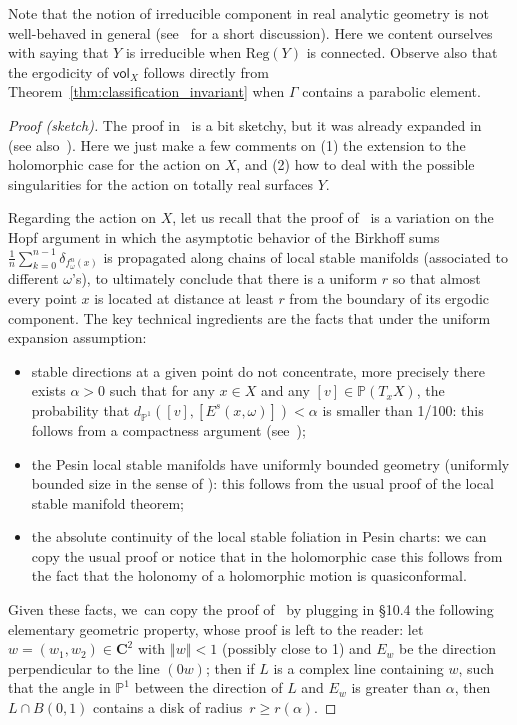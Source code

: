 \documentclass[JEP,XML,SOM,Unicode,published]{cedram}
\newcommand{\norm}[1]{{\left\Vert#1\right\Vert}}
\newcommand{\unsur}[1]{\frac{1}{#1}}
\newcommand{\lrpar}[1]{\left(#1\right)}
\newcommand{\pp}{\mathbb{P}}\let\P\pp
\def\C{\mathbf{C}}
\newcommand{\vol}{{\mathsf{vol}}}
\theoremstyle{plain}
\theoremstyle{definition}
\begin{document}
Note that the notion of irreducible component in real analytic geometry is not well-behaved in general
(see~\cite[\S 5.1]{invariant} for a short discussion).
Here we content ourselves with saying that $Y$ is irreducible when $\mathrm{Reg}(Y)$ is connected.
Observe also that the ergodicity of
$\vol_X$ follows directly from Theorem~\ref{thm:classification_invariant} when $\Gamma$
contains a parabolic element.

\begin{proof}[Proof (sketch)]
The proof in~\cite{dolgopyat-krikorian} is a bit sketchy, but it was already
expanded in~\cite{liu_thesis, chung} (see also~\cite{zzhang}).
Here we just make a few comments on (1) the extension to the holomorphic case for the action on $X$,
and (2) how to deal with the possible singularities for the action on totally real surfaces $Y$.

Regarding the action on $X$, let us recall that the proof of~\cite{dolgopyat-krikorian} is a
variation on the Hopf argument in which the asymptotic behavior of the Birkhoff
sums $ \unsur{n}\sum_{k=0}^{n-1} \delta_{f_\omega^n(x)}$ is propagated along chains of
local stable manifolds (associated to different $\omega$'s), to ultimately conclude that there
is a uniform $r$ so that almost every point $x$
is located at distance at least $r$ from the boundary of its ergodic component.
The key technical ingredients are the facts that under the uniform expansion assumption:
\begin{itemize}
\item stable directions at a given point do not concentrate, more precisely there exists
$\alpha>0$ such that for any $x\in X$ and any $[v]\in \pp(T_x X)$, the probability that
$d_{\P^1}\lrpar{[v], [E^s(x,\omega) ]} <\alpha$ is smaller than 1/100: this follows from a compactness argument
(see~\cite[Prop.\,4.4.4]{liu_thesis});
\item the Pesin local stable manifolds have uniformly bounded geometry
(\eg uniformly bounded size in the sense of
\cite[\S 7.4]{stiffness}): this follows from the usual proof of the local stable manifold theorem;
\item the absolute continuity of the local stable foliation in Pesin charts: we can copy the usual proof
or notice that in the holomorphic case this follows from the fact that the holonomy of a holomorphic
motion is quasiconformal.
\end{itemize}
Given these facts, we~can copy the proof of~\cite{dolgopyat-krikorian} by plugging in \S 10.4
the following elementary geometric property, whose proof is left to the reader:
let $w = (w_1, w_2)\in \C^2$ with $\norm{w}<1$ (possibly close to 1)
and $E_w$ be the direction perpendicular to the line $(0w)$; then if
$L$ is a complex line containing $w$, such that the angle in $\P^1$
between the direction of
$L$ and $E_w$ is greater than $\alpha$, then $L\cap B(0, 1)$ contains a disk of radius~$r\geq r(\alpha)$.


\end{proof}
\end{document}

